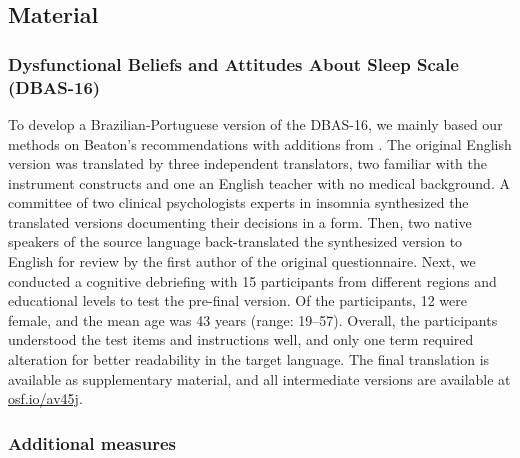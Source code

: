 \documentclass[
  12pt,
  twoside,
  openright,
  a4paper,
  chapter=TITLE,
  section=TITLE,
  brazil]{abntex2}
\begin{document}
\hypertarget{material}{%
\subsection{Material}\label{material}}

\hypertarget{dysfunctional-beliefs-and-attitudes-about-sleep-scale-dbas-16}{%
\subsubsection{Dysfunctional Beliefs and Attitudes About Sleep Scale
(DBAS-16)}\label{dysfunctional-beliefs-and-attitudes-about-sleep-scale-dbas-16}}

To develop a Brazilian-Portuguese version of the DBAS-16, we mainly
based our methods on Beaton's \autocite*{beaton2000} recommendations
with additions from \textcite{borsaAdaptacaoValidacaoInstrumentos2012}.
The original English version was translated by three independent
translators, two familiar with the instrument constructs and one an
English teacher with no medical background. A committee of two clinical
psychologists experts in insomnia synthesized the translated versions
documenting their decisions in a form. Then, two native speakers of the
source language back-translated the synthesized version to English for
review by the first author of the original questionnaire. Next, we
conducted a cognitive debriefing with 15 participants from different
regions and educational levels to test the pre-final version. Of the
participants, 12 were female, and the mean age was 43 years (range:
19--57). Overall, the participants understood the test items and
instructions well, and only one term required alteration for better
readability in the target language. The final translation is available
as supplementary material, and all intermediate versions are available
at \href{https://osf.io/av45j/}{osf.io/av45j}.

\hypertarget{additional-measures}{%
\subsubsection{Additional measures}\label{additional-measures}}
\end{document}
